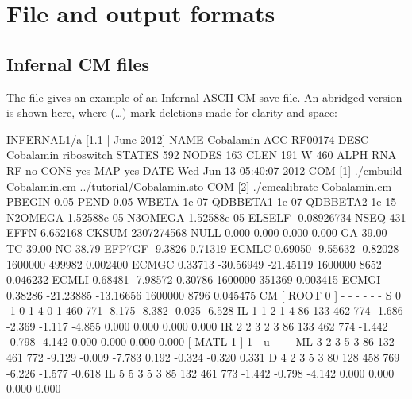 \section{File and output formats}
\label{section:formats}
\setcounter{footnote}{0}

\subsection{Infernal CM files}

The file  gives an example of an Infernal ASCII
CM save file. An abridged version is shown here, where (\ldots) mark
deletions made for clarity and space:

\begin{tinysreoutput}
INFERNAL1/a [1.1 | June 2012]
NAME     Cobalamin
ACC      RF00174
DESC     Cobalamin riboswitch
STATES   592
NODES    163
CLEN     191
W        460
ALPH     RNA
RF       no
CONS     yes
MAP      yes
DATE     Wed Jun 13 05:40:07 2012
COM      [1] ./cmbuild Cobalamin.cm ../tutorial/Cobalamin.sto
COM      [2] ./cmcalibrate Cobalamin.cm
PBEGIN   0.05
PEND     0.05
WBETA    1e-07
QDBBETA1 1e-07
QDBBETA2 1e-15
N2OMEGA  1.52588e-05
N3OMEGA  1.52588e-05
ELSELF   -0.08926734
NSEQ     431
EFFN     6.652168
CKSUM    2307274568
NULL     0.000  0.000  0.000  0.000 
GA       39.00
TC       39.00
NC       38.79
EFP7GF   -9.3826 0.71319
ECMLC    0.69050    -9.55632    -0.82028     1600000      499982  0.002400
ECMGC    0.33713   -30.56949   -21.45119     1600000        8652  0.046232
ECMLI    0.68481    -7.98572     0.30786     1600000      351369  0.003415
ECMGI    0.38286   -21.23885   -13.16656     1600000        8796  0.045475
CM
                                             [ ROOT    0 ]      -      - - - - -
     S     0    -1 0     1     4     0     1   460   771  -8.175  -8.382  -0.025  -6.528                 
    IL     1     1 2     1     4    86   133   462   774  -1.686  -2.369  -1.117  -4.855                  0.000  0.000  0.000  0.000 
    IR     2     2 3     2     3    86   133   462   774  -1.442  -0.798  -4.142                          0.000  0.000  0.000  0.000 
                                             [ MATL    1 ]      1      - u - - -
    ML     3     2 3     5     3    86   132   461   772  -9.129  -0.009  -7.783                          0.192 -0.324 -0.320  0.331 
     D     4     2 3     5     3    80   128   458   769  -6.226  -1.577  -0.618                         
    IL     5     5 3     5     3    85   132   461   773  -1.442  -0.798  -4.142                          0.000  0.000  0.000  0.000 

\end{tinysreoutput}
